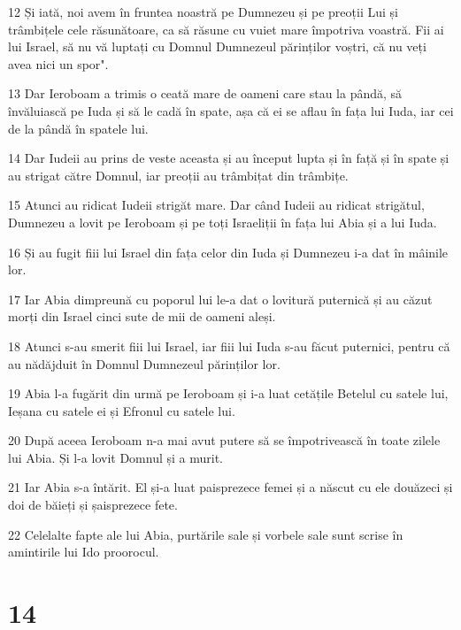 \par 12 Și iată, noi avem în fruntea noastră pe Dumnezeu și pe preoții Lui și trâmbițele cele răsunătoare, ca să răsune cu vuiet mare împotriva voastră. Fii ai lui Israel, să nu vă luptați cu Domnul Dumnezeul părinților voștri, că nu veți avea nici un spor".
\par 13 Dar Ieroboam a trimis o ceată mare de oameni care stau la pândă, să învăluiască pe Iuda și să le cadă în spate, așa că ei se aflau în fața lui Iuda, iar cei de la pândă în spatele lui.
\par 14 Dar Iudeii au prins de veste aceasta și au început lupta și în față și în spate și au strigat către Domnul, iar preoții au trâmbițat din trâmbițe.
\par 15 Atunci au ridicat Iudeii strigăt mare. Dar când Iudeii au ridicat strigătul, Dumnezeu a lovit pe Ieroboam și pe toți Israeliții în fața lui Abia și a lui Iuda.
\par 16 Și au fugit fiii lui Israel din fața celor din Iuda și Dumnezeu i-a dat în mâinile lor.
\par 17 Iar Abia dimpreună cu poporul lui le-a dat o lovitură puternică și au căzut morți din Israel cinci sute de mii de oameni aleși.
\par 18 Atunci s-au smerit fiii lui Israel, iar fiii lui Iuda s-au făcut puternici, pentru că au nădăjduit în Domnul Dumnezeul părinților lor.
\par 19 Abia l-a fugărit din urmă pe Ieroboam și i-a luat cetățile Betelul cu satele lui, Ieșana cu satele ei și Efronul cu satele lui.
\par 20 După aceea Ieroboam n-a mai avut putere să se împotrivească în toate zilele lui Abia. Și l-a lovit Domnul și a murit.
\par 21 Iar Abia s-a întărit. El și-a luat paisprezece femei și a născut cu ele douăzeci și doi de băieți și șaisprezece fete.
\par 22 Celelalte fapte ale lui Abia, purtările sale și vorbele sale sunt scrise în amintirile lui Ido proorocul.

\chapter{14}

